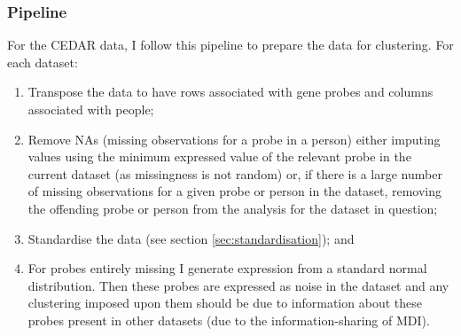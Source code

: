 \documentclass[12pt]{article} %
\begin{document}
 	\subsubsection{Pipeline}
	For the CEDAR data, I follow this pipeline to prepare the data for clustering. For each dataset:
	\begin{enumerate} \label{list:methods}
		\item Transpose the data to have rows associated with gene probes and columns associated with people;
		\item Remove NAs (missing observations for a probe in a person) either imputing values using the minimum expressed value of the relevant probe in the current dataset (as missingness is not random) or, if there is a large number of missing observations for a given probe or person in the dataset, removing the offending probe or person from the analysis for the dataset in question;
		\item Standardise the data (see section \ref{sec:standardisation}); and
		\item For probes entirely missing I generate expression from a standard normal distribution. Then these probes are expressed as noise in the dataset and any clustering imposed upon them should be due to information about these probes present in other datasets (due to the information-sharing of MDI). %
	\end{enumerate}
\end{document}
